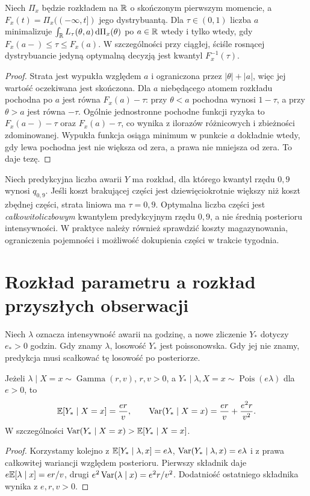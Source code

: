 \begin{twierdzenie}
\label{thm:bayes-quantile-loss}
Niech $\Pi_x$ będzie rozkładem na $\mathbb R$ o skończonym
pierwszym momencie, a $F_x(t)=\Pi_x(({-}\infty,t])$ jego
dystrybuantą. Dla $\tau\in(0,1)$ liczba $a$ minimalizuje
$\int_\mathbb R L_\tau(\theta,a)\,\mathrm d\Pi_x(\theta)$ po $a\in\mathbb R$
wtedy i tylko wtedy, gdy
$F_x(a-)\le\tau\le F_x(a)$.
W szczególności przy ciągłej, ściśle rosnącej dystrybuancie
jedyną optymalną decyzją jest kwantyl $F_x^{-1}(\tau)$.
\end{twierdzenie}
\begin{proof}
Strata jest wypukła względem $a$ i ograniczona przez
$|\theta|+|a|$, więc jej wartość oczekiwana jest skończona.
Dla $a$ niebędącego atomem rozkładu pochodna po $a$ jest
równa $F_x(a)-\tau$: przy $\theta<a$ pochodna wynosi
$1-\tau$, a przy $\theta>a$ jest równa $-\tau$.
Ogólnie jednostronne pochodne funkcji ryzyka to
$F_x(a-)-\tau$ oraz $F_x(a)-\tau$, co wynika
z ilorazów różnicowych i zbieżności zdominowanej.
Wypukła funkcja osiąga minimum w punkcie $a$ dokładnie
wtedy, gdy lewa pochodna jest nie większa od zera,
a prawa nie mniejsza od zera. To daje tezę.
\end{proof}

\begin{przyklad}
Niech predykcyjna liczba awarii $Y$ ma rozkład, dla którego
kwantyl rzędu $0{,}9$ wynosi $q_{0{,}9}$. Jeśli koszt
brakującej części jest dziewięciokrotnie większy niż koszt
zbędnej części, strata liniowa ma $\tau=0{,}9$.
Optymalna liczba części jest \emph{całkowitoliczbowym}
kwantylem predykcyjnym rzędu $0{,}9$, a nie średnią
posterioru intensywności. W praktyce należy również sprawdzić
koszty magazynowania, ograniczenia pojemności i możliwość
dokupienia części w trakcie tygodnia.
\end{przyklad}

\section{Rozkład parametru a rozkład przyszłych obserwacji}
Niech $\lambda$ oznacza intensywność awarii na godzinę,
a nowe zliczenie $Y_*$ dotyczy $e_*>0$ godzin. Gdy znamy
$\lambda$, losowość $Y_*$ jest poissonowska. Gdy jej nie
znamy, predykcja musi scałkować tę losowość po posteriorze.

\begin{twierdzenie}
\label{thm:gamma-poisson-dispersion}
Jeżeli $\lambda\mid X=x\sim\operatorname{Gamma}(r,v)$,
$r,v>0$, a $Y_*\mid\lambda,X=x\sim\operatorname{Pois}(e\lambda)$
dla $e>0$, to
\[
\mathbb E[Y_*\mid X=x]=\frac{er}{v},\qquad
\operatorname{Var}(Y_*\mid X=x)=\frac{er}{v}+\frac{e^2r}{v^2}.
\]
W szczególności $\operatorname{Var}(Y_*\mid X=x)>\mathbb E[Y_*\mid X=x]$.
\end{twierdzenie}
\begin{proof}
Korzystamy kolejno z
$\mathbb E[Y_*\mid\lambda,x]=e\lambda$,
$\operatorname{Var}(Y_*\mid\lambda,x)=e\lambda$ i z prawa całkowitej
wariancji względem posterioru. Pierwszy składnik daje
$e\mathbb E[\lambda\mid x]=er/v$, drugi
$e^2\operatorname{Var}(\lambda\mid x)=e^2r/v^2$.
Dodatniość ostatniego składnika wynika z $e,r,v>0$.
\end{proof}

